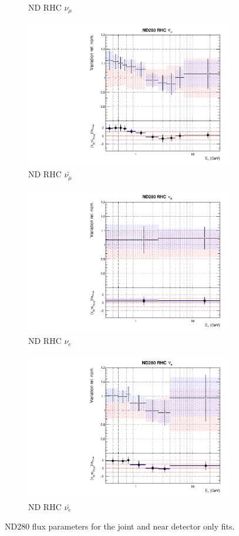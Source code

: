 \begin{figure}
\begin{subfigure}{0.45\textwidth}
  \caption{ND RHC $\nu_{\mu}$}
\end{subfigure}
\begin{subfigure}{0.45\textwidth}
  \centering
  \includegraphics[width=0.75\linewidth]{figs/jointflux5}
  \caption{ND RHC $\bar{\nu_{\mu}}$}
\end{subfigure}
\begin{subfigure}{0.45\textwidth}
  \centering
  \includegraphics[width=0.75\linewidth]{figs/jointflux6}
  \caption{ND RHC $\nu_{e}$}
\end{subfigure}
\begin{subfigure}{0.45\textwidth}
  \centering
  \includegraphics[width=0.75\linewidth]{figs/jointflux7}
  \caption{ND RHC $\bar{\nu_e}$}
\end{subfigure}
\caption{ND280 flux parameters for the joint and near detector only fits.}
\label{fig:jointfluxND}
\end{figure}

